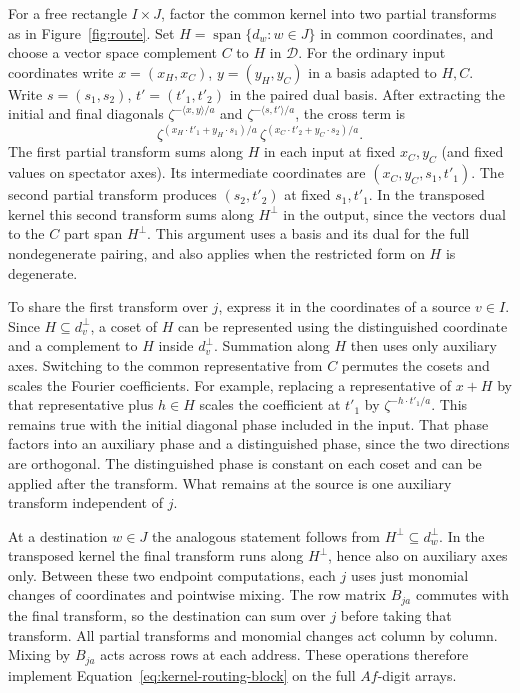 For a free rectangle \(I\times J\), factor the common kernel into
two partial transforms as in Figure~\ref{fig:route}. Set
\(H=\operatorname{span}\{d_w:w\in J\}\) in common coordinates,
and choose a vector space complement \(C\) to \(H\) in
\(\mathcal D\). For the ordinary input
coordinates write \(x=(x_H,x_C)\), \(y=(y_H,y_C)\) in a basis
adapted to \(H,C\). Write \(s=(s_1,s_2)\), \(t'=(t'_1,t'_2)\) in
the paired dual basis. After extracting the initial and final
diagonals \(\zeta^{-\langle x,y\rangle/a}\) and
\(\zeta^{-\langle s,t'\rangle/a}\), the cross term is
\[
 \zeta^{(x_H\cdot t'_1+y_H\cdot s_1)/a}\,
 \zeta^{(x_C\cdot t'_2+y_C\cdot s_2)/a}.
\]
The first partial transform sums along \(H\) in each input at
fixed \(x_C,y_C\) (and fixed values on spectator axes). Its intermediate coordinates are
\((x_C,y_C,s_1,t'_1)\). The second partial transform produces
\((s_2,t'_2)\) at fixed \(s_1,t'_1\). In the transposed kernel this
second transform sums along \(H^\perp\) in the output, since the
vectors dual to the \(C\) part span \(H^\perp\). This argument uses a
basis and its dual for the full nondegenerate pairing, and also
applies when the restricted form on \(H\) is degenerate.

To share the first transform over \(j\), express it in the coordinates
of a source \(v\in I\). Since \(H\subseteq d_v^\perp\), a coset of
\(H\) can be represented using the distinguished coordinate and a
complement to \(H\) inside \(d_v^\perp\). Summation along \(H\)
then uses only auxiliary axes. Switching to the common representative
from \(C\) permutes the cosets and scales the Fourier coefficients.
For example, replacing a representative of \(x+H\) by that
representative plus \(h\in H\) scales the coefficient at \(t'_1\)
by \(\zeta^{-h\cdot t'_1/a}\). This remains true with the initial
diagonal phase included in the input. That phase factors into an
auxiliary phase and a distinguished phase, since the two directions
are orthogonal. The distinguished phase is constant on each coset and
can be applied after the transform. What remains at the source is
one auxiliary transform independent of \(j\).

At a destination \(w\in J\) the analogous statement follows from
\(H^\perp\subseteq d_w^\perp\). In the transposed kernel the final
transform runs along \(H^\perp\), hence also on auxiliary axes only.
Between these two endpoint computations, each \(j\) uses just
monomial changes of coordinates and pointwise mixing. The row matrix
\(B_{ja}\) commutes with the final transform, so the destination can
sum over \(j\) before taking that transform. All partial transforms
and monomial changes act column by column. Mixing by \(B_{ja}\) acts
across rows at each address. These operations therefore implement
Equation~\eqref{eq:kernel-routing-block} on the full \(Af\)-digit arrays.

